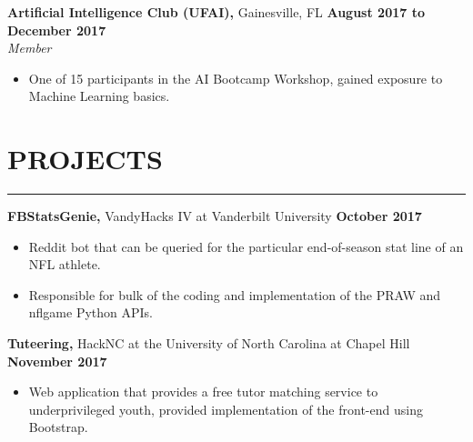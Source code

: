 \documentclass[11pt]{article} %
\begin{document}
		\vspace{.1cm}
		
		\noindent \textbf{Artificial Intelligence Club (UFAI),} Gainesville, FL \hfill\textbf{August 2017 to December 2017}\\
		\textit{Member}
		\begin{itemize}[noitemsep,nolistsep, label={-}]
			\item One of 15 participants in the AI Bootcamp Workshop, gained exposure to Machine Learning basics.
		\end{itemize}
		
		\vspace{.1cm}
		
		
	
	\section*{PROJECTS}
		\hrule \relax
		\vspace{.4cm}
		
		\noindent \textbf{FBStatsGenie,} VandyHacks IV at Vanderbilt University \hfill\textbf{October 2017}
		\begin{itemize}[noitemsep,nolistsep, label={-}]
			\item Reddit bot that can be queried for the particular end-of-season stat line of an NFL athlete.
			\item Responsible for bulk of the coding and implementation of the PRAW and nflgame Python APIs.
		\end{itemize}
		
		\vspace{.1cm}
	
		\noindent \textbf{Tuteering,} HackNC at the University of North Carolina at Chapel Hill \hfill\textbf{November 2017}
		\begin{itemize}[noitemsep,nolistsep, label={-}]
			\item Web application that provides a free tutor matching service to underprivileged youth, provided implementation of the front-end using Bootstrap.
		\end{itemize}
	
\end{document}
